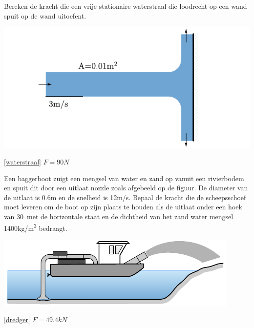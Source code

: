 \begin{toepassing}[*]
	\label{waterstraal}
Bereken de kracht die een vrije stationaire waterstraal die loodrecht op een wand spuit op de wand uitoefent.

	\centering
	\includegraphics{fig/behoudsvergelijkingen/waterstraal}
\end{toepassing}
\begin{antwoord}{\ref{waterstraal}}
	$F = 90\unit{N}$
\end{antwoord}
\begin{toepassing}
	\label{dredger}
Een baggerboot zuigt een mengsel van water en zand op vanuit een rivierbodem en spuit dit door een uitlaat nozzle zoals afgebeeld op de figuur. De diameter van de uitlaat is 0.6m en de snelheid is 12m/s. Bepaal de kracht die de scheepsschoef moet leveren om de boot op zijn plaats te houden als de uitlaat onder een hoek van 30\deg\ met de horizontale staat en de dichtheid van het zand water mengsel 1400\unit{kg/m^3} bedraagt.

	\centering
	\includegraphics{fig/behoudsvergelijkingen/dredger}
\end{toepassing}
\begin{antwoord}{\ref{dredger}}
	$F = 49.4\unit{kN}$
\end{antwoord}
